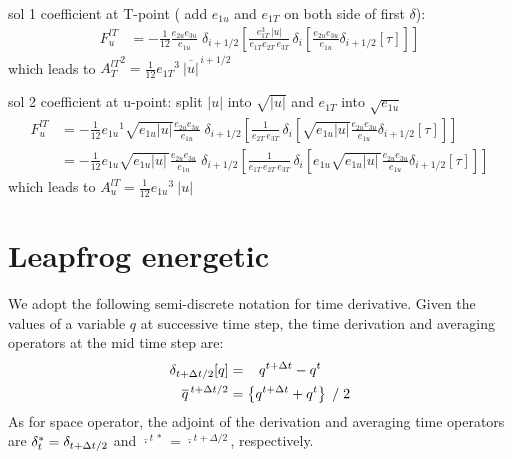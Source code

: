 \documentclass[../main/NEMO_manual]{subfiles}
\begin{document}
sol 1 coefficient at T-point ( add $e_{1u}$ and $e_{1T}$ on both side of first $\delta$):
\begin{equation}
  \label{eq:ALGOS_tra_adv_ubs2}
  \begin{split}
    F_u^{lT} &= - \frac{1}{12} \frac{e_{2u} e_{3u}}{e_{1u}}\;\delta_{i+1/2}\left[ \frac{e_{1T}^3\,|u|}{e_{1T}e_{2T}\,e_{3T}}\,\delta_i \left[ \frac{e_{2u} e_{3u} }{e_{1u} } \delta_{i+1/2}[\tau] \right] \right]
  \end{split}
\end{equation}
which leads to ${A_T^{lT}}^2 = \frac{1}{12} {e_{1T}}^3\ \overline{|u|}^{\,i+1/2}$

sol 2 coefficient at u-point: split $|u|$ into $\sqrt{|u|}$ and $e_{1T}$ into $\sqrt{e_{1u}}$
\begin{equation}
  \label{eq:ALGOS_tra_adv_ubs2}
  \begin{split}
    F_u^{lT} &= - \frac{1}{12} {e_{1u}}^1 \sqrt{e_{1u}|u|} \frac{e_{2u} e_{3u}}{e_{1u}}\;\delta_{i+1/2}\left[ \frac{1}{e_{2T}\,e_{3T}}\,\delta_i \left[ \sqrt{e_{1u}|u|} \frac{e_{2u} e_{3u} }{e_{1u} } \delta_{i+1/2}[\tau] \right] \right] \\
    &= - \frac{1}{12} e_{1u} \sqrt{e_{1u}|u|\,} \frac{e_{2u} e_{3u}}{e_{1u}}\;\delta_{i+1/2}\left[ \frac{1}{e_{1T}\,e_{2T}\,e_{3T}}\,\delta_i \left[ e_{1u} \sqrt{e_{1u}|u|\,} \frac{e_{2u} e_{3u} }{e_{1u}} \delta_{i+1/2}[\tau] \right] \right]
  \end{split}
\end{equation}
which leads to ${A_u^{lT}} = \frac{1}{12} {e_{1u}}^3\ |u|$

\section{Leapfrog energetic}
\label{sec:ALGOS_LF}

We adopt the following semi-discrete notation for time derivative.
Given the values of a variable $q$ at successive time step,
the time derivation and averaging operators at the mid time step are:
\[
  \begin{split}
    \delta_{t+\Delta t/2} [q]     &=  \  \ \,   q^{t+\Delta t}  - q^{t}		\\
    \overline q^{\,t+\Delta t/2} &= \left\{ q^{t+\Delta t} + q^{t} \right\} \; / \; 2
  \end{split}
\]
As for space operator,
the adjoint of the derivation and averaging time operators are $\delta_t^*=\delta_{t+\Delta t/2}$ and
$\overline{\cdot}^{\,t\,*}= \overline{\cdot}^{\,t+\Delta/2}$, respectively.
\end{document}
